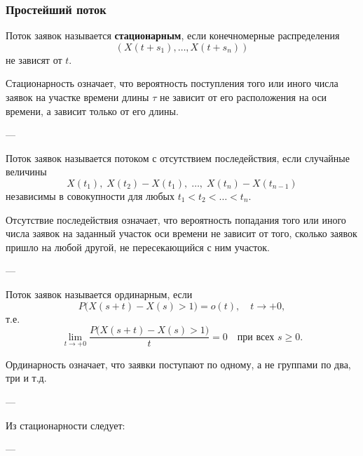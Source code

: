 \subsubsection*{Простейший поток}

Поток заявок называется \textbf{стационарным}, если конечномерные распределения
\[
	(X(t + s_1), \ldots, X(t + s_n))
\]
не зависят от $t$.

Стационарность означает, что вероятность поступления того или иного числа заявок
на участке времени длины $\tau$ не зависит от его расположения на оси времени,
а зависит только от его длины.

---

Поток заявок называется потоком с отсутствием последействия, если случайные величины
\[
	X(t_1), \; X(t_2) - X(t_1), \; \ldots, \; X(t_n) - X(t_{n-1})
\]
независимы в совокупности для любых $t_1 < t_2 < \ldots < t_n$.

Отсутствие последействия означает, что вероятность попадания того или иного числа заявок
на заданный участок оси времени не зависит от того, сколько заявок пришло
на любой другой, не пересекающийся с ним участок.

---

Поток заявок называется ординарным, если
\[
	P\big(X(s + t) - X(s) > 1\big) = o(t), \quad t \to +0,
\]
т.е.
\[
	\lim_{t \to +0} \frac{P\big(X(s + t) - X(s) > 1\big)}{t} = 0
	\quad \text{при всех } s \ge 0.
\]

Ординарность означает, что заявки поступают по одному,
а не группами по два, три и т.д.

---

Из стационарности следует:


---